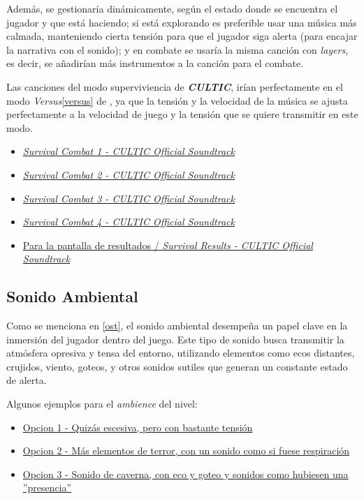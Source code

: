         Además, se gestionaría dinámicamente, según el estado donde se encuentra el jugador y que está haciendo; si está explorando es preferible usar una música más calmada, manteniendo cierta tensión para que el jugador siga alerta (para encajar la narrativa con el sonido); y en combate se usaría la misma canción con \textit{layers}, es decir, se añadirían más instrumentos a la canción para el combate.

        Las canciones del modo superviviencia de \textit{\textbf{CULTIC}}, irían perfectamente en el modo \textit{Versus}\ref{versus} de \TWD, ya que la tensión y la velocidad de la música se ajusta perfectamente a la velocidad de juego y la tensión que se quiere transmitir en este modo.
        \begin{itemize}
            \item \href{https://www.youtube.com/watch?v=LXxBT9cmWjI&t=3835s}{\textit{Survival Combat 1 - CULTIC Official Soundtrack}}
            \item \href{https://www.youtube.com/watch?v=LXxBT9cmWjI&t=3931s}{\textit{Survival Combat 2 - CULTIC Official Soundtrack}}
            \item \href{https://www.youtube.com/watch?v=LXxBT9cmWjI&t=4075s}{\textit{Survival Combat 3 - CULTIC Official Soundtrack}}
            \item \href{https://www.youtube.com/watch?v=LXxBT9cmWjI&t=4219s}{\textit{Survival Combat 4 - CULTIC Official Soundtrack}}
            \item \href{https://www.youtube.com/watch?v=LXxBT9cmWjI&t=4315s}{Para la pantalla de resultados / \textit{Survival Results - CULTIC Official Soundtrack}}
        \end{itemize}
    \subsection{Sonido Ambiental}
    Como se menciona en \ref{ost}, el sonido ambiental desempeña un papel clave en la inmersión del jugador dentro del juego. Este tipo de sonido busca transmitir la atmósfera opresiva y tensa del entorno, utilizando elementos como ecos distantes, crujidos, viento, goteos, y otros sonidos sutiles que generan un constante estado de alerta.

    Algunos ejemplos para el \textit{ambience} del nivel:
    \begin{itemize}
        \item \href{https://drive.google.com/open?id=1-BAV8BI2FhwryOpE2sznbGjXXjKJc67C&usp=drive_fs}{Opcion 1 - Quizás escesiva, pero con bastante tensión}
        \item \href{https://drive.google.com/open?id=1-IY4kPhNsTwj1qDsUoW82h4YJGS7cgLj&usp=drive_fs}{Opcion 2 - Más elementos de terror, con un sonido como si fuese respiración}
        \item \href{https://drive.google.com/open?id=1-MlHY4gsA-Nj3UdmaBdFvPJ8E1NEC-u2&usp=drive_fs}{Opcion 3 - Sonido de caverna, con eco y goteo y sonidos como hubiesen una ''presencia''}
    \end{itemize}

